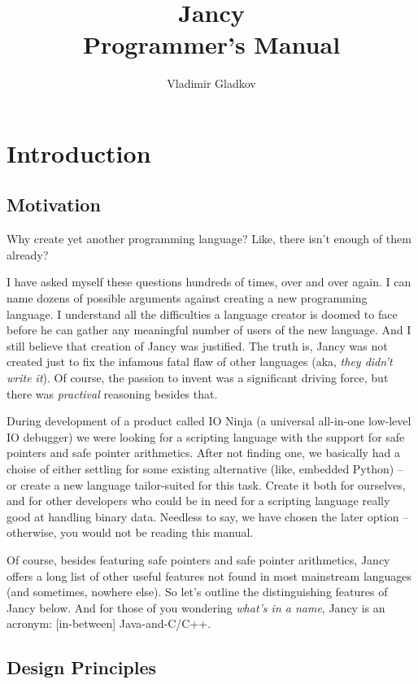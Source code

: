 \documentclass[oneside]{book}
\title{Jancy\\Programmer's Manual}
\author{Vladimir Gladkov}
\begin{document}
\maketitle
\thispagestyle{empty}
\newpage
\tableofcontents

\chapter{Introduction}

\section{Motivation}

Why create yet another programming language? Like, there isn't enough of them already?

I have asked myself these questions hundreds of times, over and over again. I can name dozens of possible arguments against creating a new programming language. I understand all the difficulties a language creator is doomed to face before he can gather any meaningful number of users of the new language. And I still believe that creation of Jancy was justified. The truth is, Jancy was not created just to fix the infamous fatal flaw of other languages (aka, \emph{they didn't write it}). Of course, the passion to invent was a significant driving force, but there was \emph{practival} reasoning besides that. 

During development of a product called IO Ninja (a universal all-in-one low-level IO debugger) we were looking for a scripting language with the support for safe pointers and safe pointer arithmetics. After not finding one, we basically had a choise of either settling for some existing alternative (like, embedded Python) -- or create a new language tailor-suited for this task. Create it both for ourselves, and for other developers who could be in need for a scripting language really good at handling binary data. Needless to say, we have chosen the later option -- otherwise, you would not be reading this manual.

Of course, besides featuring safe pointers and safe pointer arithmetics, Jancy offers a long list of other useful features not found in most mainstream languages (and sometimes, nowhere else). So let's outline the distinguishing features of Jancy below. And for those of you wondering \emph{what's in a name}, Jancy is an acronym: [in-between] Java-and-C/C++.

\section{Design Principles}
\end{document}
